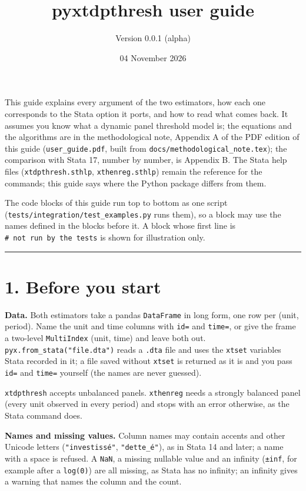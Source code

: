 \documentclass[
  10.5pt,
  a4paper,
]{article}
\title{pyxtdpthresh user guide}
\subtitle{Version 0.0.1 (alpha)}
\author{}
\date{04 November 2026}
\begin{document}
\maketitle

{
\setcounter{tocdepth}{2}
\tableofcontents
}
This guide explains every argument of the two estimators, how each one
corresponds to the Stata option it ports, and how to read what comes
back. It assumes you know what a dynamic panel threshold model is; the
equations and the algorithms are in the methodological note, Appendix A
of the PDF edition of this guide (\texttt{user\_guide.pdf}, built from
\texttt{docs/methodological\_note.tex}); the comparison with Stata 17,
number by number, is Appendix B. The Stata help files
(\texttt{xtdpthresh.sthlp}, \texttt{xthenreg.sthlp}) remain the
reference for the commands; this guide says where the Python package
differs from them.

The code blocks of this guide run top to bottom as one script
(\texttt{tests/integration/test\_examples.py} runs them), so a block may
use the names defined in the blocks before it. A block whose first line
is \texttt{\#\ not\ run\ by\ the\ tests} is shown for illustration only.

\begin{center}\rule{0.5\linewidth}{0.5pt}\end{center}

\section{1. Before you start}\label{before-you-start}

\textbf{Data.} Both estimators take a pandas \texttt{DataFrame} in long
form, one row per (unit, period). Name the unit and time columns with
\texttt{id=} and \texttt{time=}, or give the frame a two-level
\texttt{MultiIndex} (unit, time) and leave both out.
\texttt{pyx.from\_stata("file.dta")} reads a \texttt{.dta} file and uses
the \texttt{xtset} variables Stata recorded in it; a file saved without
\texttt{xtset} is returned as it is and you pass \texttt{id=} and
\texttt{time=} yourself (the names are never guessed).

\texttt{xtdpthresh} accepts unbalanced panels. \texttt{xthenreg} needs a
strongly balanced panel (every unit observed in every period) and stops
with an error otherwise, as the Stata command does.

\textbf{Names and missing values.} Column names may contain accents and
other Unicode letters (\texttt{"investissé"}, \texttt{"dette\_é"}), as
in Stata 14 and later; a name with a space is refused. A \texttt{NaN}, a
missing nullable value and an infinity (\texttt{±inf}, for example after
a \texttt{log(0)}) are all missing, as Stata has no infinity; an
infinity gives a warning that names the column and the count.
\end{document}
